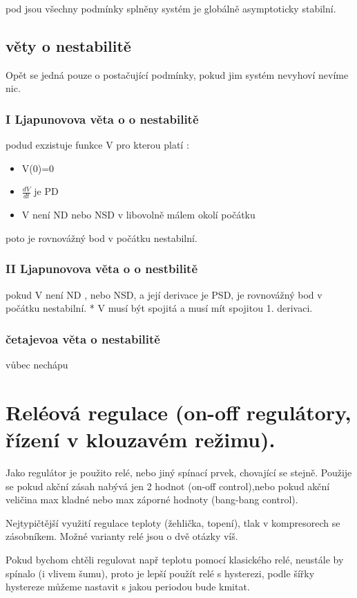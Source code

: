 pod jsou všechny podmínky splněny systém je globálně asymptoticky stabilní.

\subsection{věty o nestabilitě}
Opět se jedná pouze o postačující podmínky, pokud jim systém nevyhoví nevíme nic.

\subsubsection{I Ljapunovova věta o o nestabilitě}
podud exzistuje funkce V pro kterou platí :
\begin{itemize}
    \item V(0)=0
    \item $\frac{dV}{dt}$ je PD
    \item V není ND nebo NSD v libovolně málem okolí počátku
\end{itemize}
poto je rovnovážný bod v počátku nestabilní.

\subsubsection{II Ljapunovova věta o o nestbilitě}
pokud V není ND , nebo NSD, a její derivace je PSD, je rovnovážný bod v počátku nestabilní.
* V musí být spojitá a musí mít spojitou 1. derivaci.
\subsubsection{četajevoa věta o nestabilitě}
vůbec nechápu

\section{Reléová regulace (on-off regulátory, řízení v klouzavém režimu).
 }

Jako regulátor je použito relé, nebo jiný spínací prvek, chovající se stejně.
Použije se pokud akční zásah nabývá jen 2 hodnot (on-off control),nebo pokud akční veličina max kladné nebo max záporné hodnoty (bang-bang control).

Nejtypičtější využití regulace teploty (žehlička, topení), tlak v kompresorech se zásobníkem.
Možné varianty relé jsou o dvě otázky víš.

Pokud bychom chtěli regulovat např teplotu pomocí klasického relé, neustále by spínalo  (i vlivem šumu), proto je lepší použít relé s hysterezi, podle šířky hystereze můžeme nastavit s jakou periodou bude kmitat.

